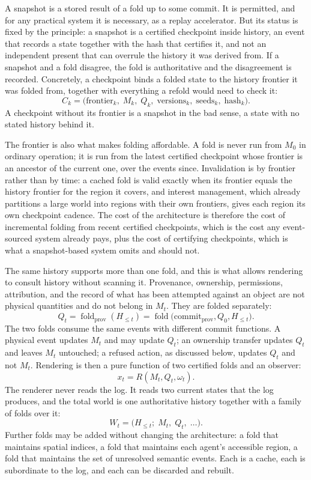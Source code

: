 \documentclass[11pt]{article}
\DeclareMathOperator{\fold}{fold}
\begin{document}
A snapshot is a stored result of a fold up to some commit. It is permitted, and for any practical system it is necessary, as a replay accelerator. But its status is fixed by the principle: a snapshot is a certified checkpoint inside history, an event that records a state together with the hash that certifies it, and not an independent present that can overrule the history it was derived from. If a snapshot and a fold disagree, the fold is authoritative and the disagreement is recorded. Concretely, a checkpoint binds a folded state to the history frontier it was folded from, together with everything a refold would need to check it:
\[
C_k = \bigl(\text{frontier}_k,\; M_k,\; Q_k,\; \text{versions}_k,\; \text{seeds}_k,\; \text{hash}_k\bigr).
\]
A checkpoint without its frontier is a snapshot in the bad sense, a state with no stated history behind it.

The frontier is also what makes folding affordable. A fold is never run from $M_0$ in ordinary operation; it is run from the latest certified checkpoint whose frontier is an ancestor of the current one, over the events since. Invalidation is by frontier rather than by time: a cached fold is valid exactly when its frontier equals the history frontier for the region it covers, and interest management, which already partitions a large world into regions with their own frontiers, gives each region its own checkpoint cadence. The cost of the architecture is therefore the cost of incremental folding from recent certified checkpoints, which is the cost any event-sourced system already pays, plus the cost of certifying checkpoints, which is what a snapshot-based system omits and should not.

The same history supports more than one fold, and this is what allows rendering to consult history without scanning it. Provenance, ownership, permissions, attribution, and the record of what has been attempted against an object are not physical quantities and do not belong in $M_t$. They are folded separately:
\[
Q_t = \fold_{\mathrm{prov}}(H_{\leq t}) = \fold\bigl(\mathrm{commit}_{\mathrm{prov}}, Q_0, H_{\leq t}\bigr).
\]
The two folds consume the same events with different commit functions. A physical event updates $M_t$ and may update $Q_t$; an ownership transfer updates $Q_t$ and leaves $M_t$ untouched; a refused action, as discussed below, updates $Q_t$ and not $M_t$. Rendering is then a pure function of two certified folds and an observer:
\[
x_t = R(M_t, Q_t, \omega_t).
\]
The renderer never reads the log. It reads two current states that the log produces, and the total world is one authoritative history together with a family of folds over it:
\[
W_t = \bigl(H_{\leq t};\; M_t,\; Q_t,\; \dots\bigr).
\]
Further folds may be added without changing the architecture: a fold that maintains spatial indices, a fold that maintains each agent's accessible region, a fold that maintains the set of unresolved semantic events. Each is a cache, each is subordinate to the log, and each can be discarded and rebuilt.
\end{document}
